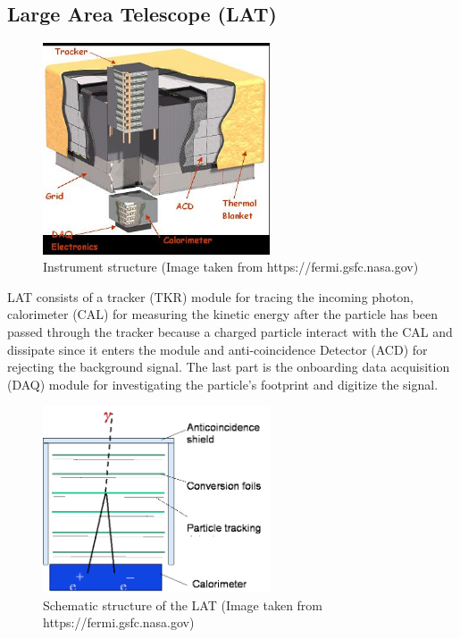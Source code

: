\subsection{Large Area Telescope (LAT)}


\begin{figure}[h!]
    \centering
    \includegraphics[width=0.6\textwidth]{content/background/figures/LATStructure.jpg}
    \caption{Instrument structure (Image taken from https://fermi.gsfc.nasa.gov)}
    \label{fig:fermi_lat_structure}
\end{figure}

LAT consists of a tracker (TKR) module for tracing the incoming photon,
calorimeter (CAL) for measuring the kinetic energy after the particle 
has been passed through the tracker because a charged particle 
interact with the CAL and dissipate since it enters the module
and anti-coincidence Detector (ACD) for rejecting the background 
signal. The last part is the onboarding data acquisition (DAQ)
module for investigating the particle's footprint and digitize
the signal.


\begin{figure}[h!]
    \centering
    \includegraphics[width=0.6\textwidth]{content/background/figures/LAT_layers.png}
    \caption{Schematic structure of the LAT (Image taken from https://fermi.gsfc.nasa.gov)}
    \label{fig:fermi_lat_layers}
\end{figure}




